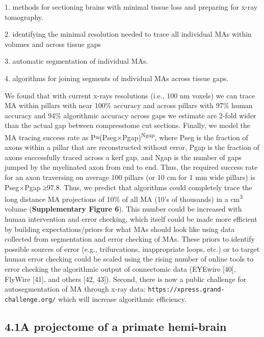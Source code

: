 \documentclass{article}
\begin{document}
\begin{hangpars}\setlength{\parindent}{0pt}
1. methods for sectioning brains with minimal tissue loss and preparing for x-ray tomography.

2. identifying the minimal resolution needed to trace all individual MAs within volumes and across tissue gaps

3. automatic segmentation of individual MAs.

4. algorithms for joining segments of individual MAs across tissue gaps.
\end{hangpars}

We found that with current x-rays resolutions (i.e., 100 nm voxels) we can trace MA within pillars with near 100\% accuracy and across pillars with 97\% human accuracy and 94\% algorithmic accuracy across gaps we estimate are 2-fold wider than the actual gap between compresstome cut sections. Finally, we model the MA tracing success rate as P≈(Pseg×Pgap)\textsuperscript{Ngap}, where Pseg is the fraction of axons within a pillar that are reconstructed without error, Pgap is the fraction of axons successfully traced across a kerf gap, and Ngap is the number of gaps jumped by the myelinated axon from end to end. Thus, the required success rate for an axon traversing on average 100 pillars (or 10 cm for 1 mm wide pillars) is Pseg×Pgap ≥97.8. Thus, we predict that algorithms could completely trace the long distance MA projections of 10\% of all MA (10’s of thousands) in a cm\textsuperscript{3} volume (\textbf{Supplementary Figure 6}). This number could be increased with human intervention and error checking, which itself could be made more efficient by building expectations/priors for what MAs should look like using data collected from segmentation and error checking of MAs. These priors to identify possible sources of error (e.g., trifurcations, inappropriate loops, etc.) or to target human error checking could be scaled using the rising number of online tools to error checking the algorithmic output of connectomic data (EYEwire [40], FlyWire [41], and others [42, 43]). Second, there is now a public challenge for autosegmentation of MA through x-ray data: \texttt{https://xpress.grand-challenge.org/} which will increase algorithmic efficiency.


\subsection*{4.1\quad A projectome of a primate hemi-brain}
\end{document}
